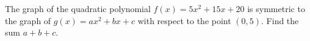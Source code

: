 The graph of the quadratic polynomial $f(x)=5x^{2}+15x+20$ is symmetric to the graph of $g(x)=ax^2+bx+c$ with respect to the point $(0,5)$. Find the sum $a+b+c$.

